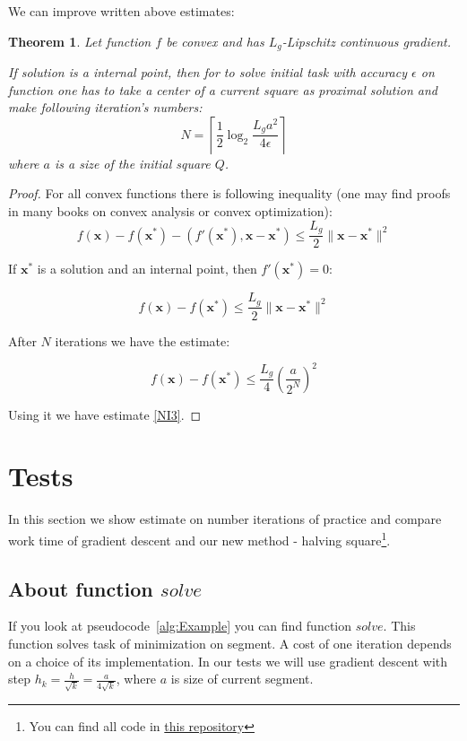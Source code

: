 \documentclass[12pt]{article}
\newtheorem{theorem}{Theorem}[section]
\begin{document}
We can improve written above estimates:

\begin{theorem}
Let function $f$ be convex and has $L_g$-Lipschitz continuous gradient.

If solution is a internal point, then for to solve initial task with accuracy $\epsilon$ on function one has to take a center of a current square as proximal solution and make following iteration's numbers:
\begin{equation}\label{NI3}N = \left\lceil\frac{1}{2}\log_2\frac{L_ga^2}{4\epsilon}\right\rceil\end{equation}
where $a$ is a size of the initial square $Q$.
\end{theorem}

\begin{proof}
For all convex functions there is following inequality (one may find proofs in many books on convex analysis or convex optimization):
$$f(\textbf{x}) - f(\textbf{x}^*) - (f'(\textbf{x}^*), \textbf{x} - \textbf{x}^*) \leq \frac{L_g}{2}\|\textbf{x}-\textbf{x}^*\|^2$$

If $\textbf{x}^*$ is a solution and an internal point, then $f'(\textbf{x}^*) = 0$:

$$f(\textbf{x}) - f(\textbf{x}^*)\leq \frac{L_g}{2}\|\textbf{x}-\textbf{x}^*\|^2$$

After $N$ iterations we have the estimate:

$$f(\textbf{x}) - f(\textbf{x}^*)\leq \frac{L_g}{4}\left(\frac{a}{2^N}\right)^2$$

Using it we have estimate \eqref{NI3}.
\end{proof}

\section{Tests}

In this section we show estimate on number iterations of practice and compare work time of gradient descent and our new method - halving square\footnote{You can find all code in \href{https://github.com/ASEDOS999/Optimization-Halving-The-Square/tree/master/Tests}{this repository}}.

\subsection{About function $solve$}

If you look at pseudocode~\ref{alg:Example} you can find function $solve$. This function solves task of minimization on segment. A cost of one iteration depends on a choice of its implementation. In our tests we will use gradient descent with step $h_k = \frac{h}{\sqrt{k}} = \frac{a}{4\sqrt{k}}$, where $a$ is size of current segment.
\end{document}
